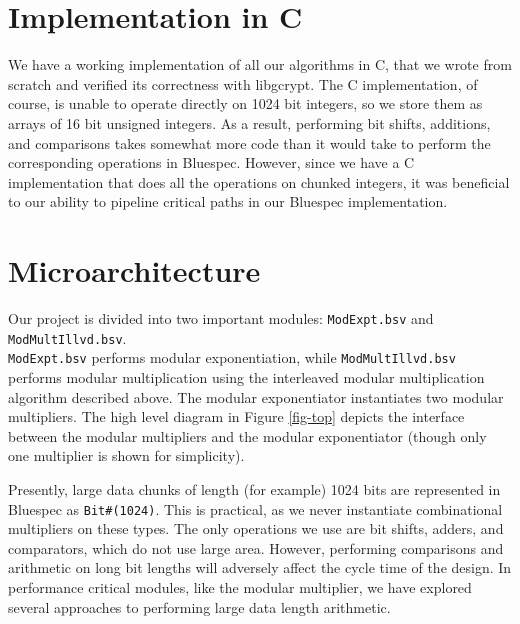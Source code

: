 \documentclass[12pt]{article}
\begin{document}
\section{Implementation in C}
We have a working implementation of all our algorithms in C, that we wrote from scratch and verified its correctness with libgcrypt.  
The C implementation, of course, is unable to operate directly on 1024 bit integers, so we store them as arrays of 16 bit unsigned integers.
As a result, performing bit shifts, additions, and comparisons
takes somewhat more code than it would take to perform the corresponding operations in Bluespec.
However, since we have a C implementation that does all the operations on chunked integers, it was beneficial to our ability to pipeline
critical paths in our Bluespec implementation.

\section{Microarchitecture}
Our project is divided into two important modules: {\tt ModExpt.bsv} and {\tt ModMultIllvd.bsv}.
\\
{\tt ModExpt.bsv} performs modular exponentiation,
while {\tt ModMultIllvd.bsv} performs modular multiplication using the interleaved modular multiplication algorithm described above.
The modular exponentiator instantiates two modular multipliers.
The high level diagram in Figure \ref{fig-top} depicts the interface between
the modular multipliers and the modular exponentiator
(though only one multiplier is shown for simplicity).

Presently, large data chunks of length (for example) 1024 bits
are represented in Bluespec as {\tt Bit\#(1024)}.
This is practical, as we never instantiate combinational multipliers on these types.
The only operations we use are bit shifts, adders, and comparators, which do not use large area.
 However, performing comparisons and arithmetic on long bit lengths will adversely affect the cycle time of the design.
In performance critical modules, like the modular multiplier, we have explored several approaches to performing 
large data length arithmetic. 
\end{document}
